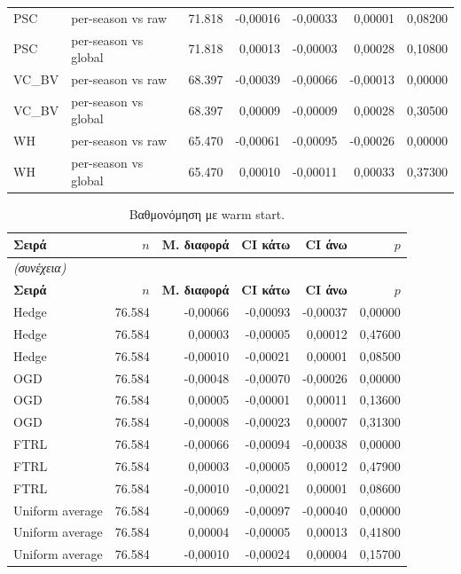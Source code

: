 {\begin{longtable}{@{}llrrrrr@{}}
PSC & per-season vs raw & 71.818 & -0,00016 & -0,00033 & 0,00001 & 0,08200 \\
PSC & per-season vs global & 71.818 & 0,00013 & -0,00003 & 0,00028 & 0,10800 \\
VC\_BV & per-season vs raw & 68.397 & -0,00039 & -0,00066 & -0,00013 & 0,00000 \\
VC\_BV & per-season vs global & 68.397 & 0,00009 & -0,00009 & 0,00028 & 0,30500 \\
WH & per-season vs raw & 65.470 & -0,00061 & -0,00095 & -0,00026 & 0,00000 \\
WH & per-season vs global & 65.470 & 0,00010 & -0,00011 & 0,00033 & 0,37300 \\
\end{longtable}
}

{\small
\begin{longtable}{@{}lrrrrr@{}}
\caption{Βαθμονόμηση με warm start.}\label{app:calwarm}\\
\toprule \textbf{Σειρά} & \textbf{$n$} & \textbf{Μ. διαφορά} & \textbf{CI κάτω} & \textbf{CI άνω} & \textbf{$p$} \\\midrule\endfirsthead
\multicolumn{6}{l}{\emph{(συνέχεια)}}\\\toprule \textbf{Σειρά} & \textbf{$n$} & \textbf{Μ. διαφορά} & \textbf{CI κάτω} & \textbf{CI άνω} & \textbf{$p$} \\\midrule\endhead
\bottomrule\endfoot
Hedge & 76.584 & -0,00066 & -0,00093 & -0,00037 & 0,00000 \\
Hedge & 76.584 & 0,00003 & -0,00005 & 0,00012 & 0,47600 \\
Hedge & 76.584 & -0,00010 & -0,00021 & 0,00001 & 0,08500 \\
OGD & 76.584 & -0,00048 & -0,00070 & -0,00026 & 0,00000 \\
OGD & 76.584 & 0,00005 & -0,00001 & 0,00011 & 0,13600 \\
OGD & 76.584 & -0,00008 & -0,00023 & 0,00007 & 0,31300 \\
FTRL & 76.584 & -0,00066 & -0,00094 & -0,00038 & 0,00000 \\
FTRL & 76.584 & 0,00003 & -0,00005 & 0,00012 & 0,47900 \\
FTRL & 76.584 & -0,00010 & -0,00021 & 0,00001 & 0,08600 \\
Uniform average & 76.584 & -0,00069 & -0,00097 & -0,00040 & 0,00000 \\
Uniform average & 76.584 & 0,00004 & -0,00005 & 0,00013 & 0,41800 \\
Uniform average & 76.584 & -0,00010 & -0,00024 & 0,00004 & 0,15700 \\

\end{longtable}}
